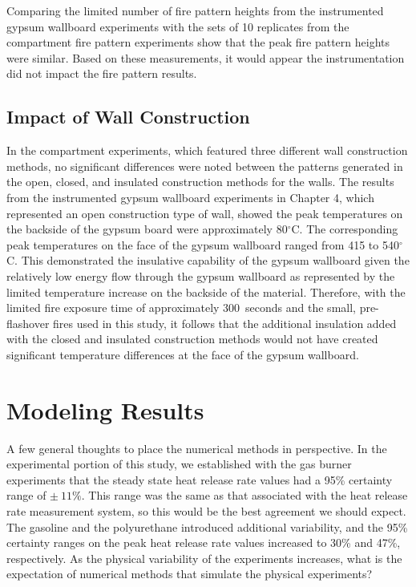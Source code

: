 \documentclass[twoside]{uocthesis}
\begin{document}
{Comparing the limited number of fire pattern heights from the instrumented gypsum wallboard experiments with the sets of 10 replicates from the compartment fire pattern experiments show that the peak fire pattern heights were similar.  Based on these measurements, it would appear the instrumentation did not impact the fire pattern results.

\subsection{Impact of Wall Construction}

In the compartment experiments, which featured three different wall construction methods, no significant differences were noted between the patterns generated in the open, closed, and insulated construction methods for the walls.  The results from the instrumented gypsum wallboard experiments in Chapter 4, which represented an open construction type of wall, showed the peak temperatures on the backside of the gypsum board were approximately 80$^\circ$C.  The corresponding peak temperatures on the face of the gypsum wallboard ranged from 415 to 540$^\circ$C.  This demonstrated the insulative capability of the gypsum wallboard given the relatively low energy flow through the gypsum wallboard as represented by the limited temperature increase on the backside of the material.  Therefore, with the limited fire exposure time of approximately 300~seconds and the small, pre-flashover fires used in this study, it follows that the additional insulation added with the closed and insulated construction methods would not have created significant temperature differences at the face of the gypsum wallboard.  

\section{Modeling Results}

A few general thoughts to place the numerical methods in perspective.  In the experimental portion of this study, we established with the gas burner experiments that the steady state heat release rate values had a 95\% certainty range of $\pm~11\%$.  This range was the same as that associated with the heat release rate measurement system, so this would be the best agreement we should expect.  The gasoline and the polyurethane introduced additional variability, and the 95\% certainty ranges on the peak heat release rate values increased to 30\% and 47\%, respectively.  As the physical variability of the experiments increases, what is the expectation of numerical methods that simulate the physical experiments?    

}
\end{document}
